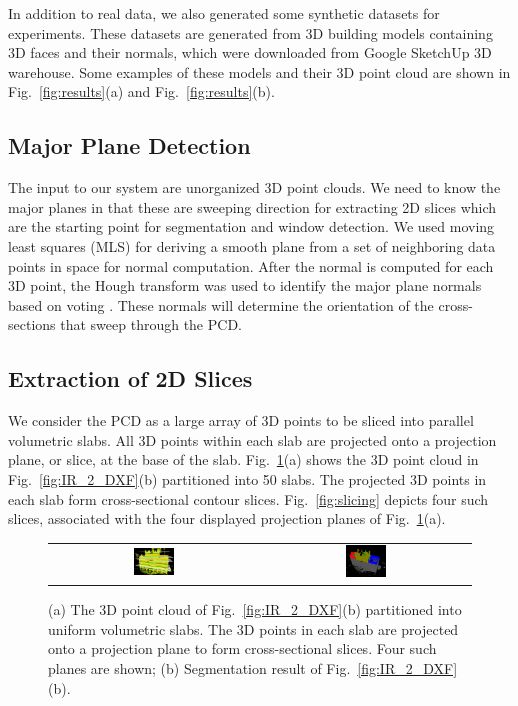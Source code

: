 \documentclass[10pt,twocolumn,letterpaper]{article}
\newcommand{\Fig}[1]{Fig.~\ref{fig:#1}}
\newcommand{\Figa}[1]{Fig.~\ref{fig:#1}(a)}
\newcommand{\Figb}[1]{Fig.~\ref{fig:#1}(b)}
\begin{document}
In addition to real data, we also generated some synthetic datasets for experiments.
These datasets are generated from 3D building models 
containing 3D faces and their normals, 
which were downloaded from Google SketchUp 3D warehouse.
Some examples of these models and their 3D point cloud are shown in \Figa{results}
and \Figb{results}.

\subsection{Major Plane Detection}
\label{sec:major_plane}

The input to our system are unorganized 3D point clouds.
We need to know the major planes in that
these are sweeping direction for extracting 2D slices which
are the starting point for segmentation and window detection.
We used moving least squares (MLS) for deriving a smooth plane from a set
of neighboring data points in space for normal computation.
After the normal is computed for each 3D point, the Hough transform was used
to identify the major plane normals based on voting \cite{MLS01}.
These normals will determine the orientation of the cross-sections that
sweep through the PCD.

\subsection{Extraction of 2D Slices}
\label{sec:image_slicing}

We consider the PCD as a large array of 3D points to be
sliced into parallel volumetric slabs.
All 3D points within each slab are projected onto a projection plane, or slice,
at the base of the slab.
\Figa{slice_slab} shows the 3D point cloud in \Figb{IR_2_DXF} partitioned into
50 slabs.
The projected 3D points in each slab form cross-sectional contour slices.
\Fig{slicing} depicts four such slices, associated with the four displayed
projection planes of \Figa{slice_slab}.

\begin{figure} [htbp]
\begin{center}
\begin{tabular}{cc}
\includegraphics[width=0.2\textwidth]{slab_planar.png} &
\includegraphics[width=0.2\textwidth]{TH_7.png} 
\end{tabular}
\end{center}
\caption{(a) The 3D point cloud of \Figb{IR_2_DXF} partitioned into uniform
volumetric slabs.
The 3D points in each slab are projected onto a projection plane to
form cross-sectional slices. Four such planes are shown;
(b) Segmentation result of \Figb{IR_2_DXF}.}
\label{fig:slice_slab}
\end{figure}
\end{document}
